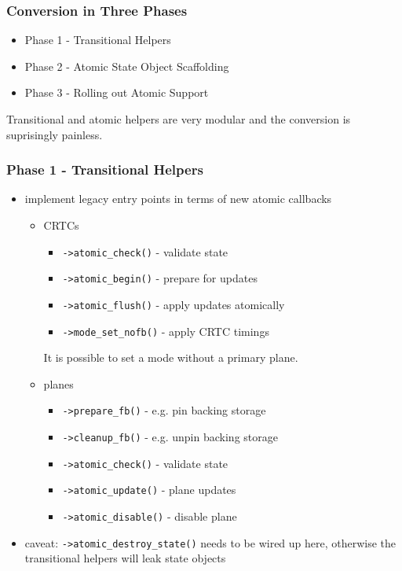 \documentclass[t]{beamer}
\begin{document}
\begin{frame}
	\frametitle{Conversion in Three Phases}
	\begin{itemize}
		\item Phase 1 - Transitional Helpers
		\item Phase 2 - Atomic State Object Scaffolding
		\item Phase 3 - Rolling out Atomic Support
	\end{itemize}
	Transitional and atomic helpers are very modular and the conversion is
	suprisingly painless.
\end{frame}

\begin{frame}
	\frametitle{Phase 1 - Transitional Helpers}
	\begin{itemize}
		\item implement legacy entry points in terms of new atomic callbacks
			\begin{itemize}
				\item CRTCs
					\begin{itemize}
						\item {\tt ->atomic\_check()} - validate state
						\item {\tt ->atomic\_begin()} - prepare for updates
						\item {\tt ->atomic\_flush()} - apply updates atomically
						\item {\tt ->mode\_set\_nofb()} - apply CRTC timings
					\end{itemize}
					It is possible to set a mode without a primary plane.
				\item planes
					\begin{itemize}
						\item {\tt ->prepare\_fb()} - e.g. pin backing storage
						\item {\tt ->cleanup\_fb()} - e.g. unpin backing storage
						\item {\tt ->atomic\_check()} - validate state
						\item {\tt ->atomic\_update()} - plane updates
						\item {\tt ->atomic\_disable()} - disable plane
					\end{itemize}
			\end{itemize}
		\item caveat: {\tt ->atomic\_destroy\_state()} needs to be wired up
			here, otherwise the transitional helpers will leak state objects
	\end{itemize}
\end{frame}
\end{document}

